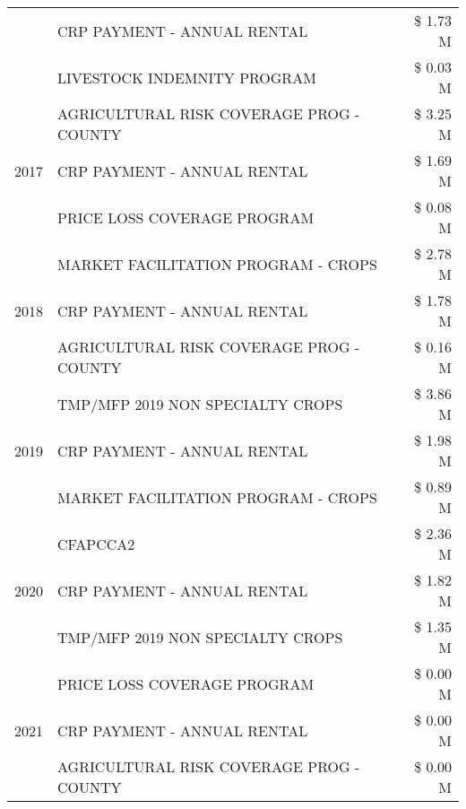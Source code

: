 \begin{tabular}{llr}
 & CRP PAYMENT - ANNUAL RENTAL & \$ 1.73 M \\
 & LIVESTOCK INDEMNITY PROGRAM & \$ 0.03 M \\
\cline{1-3}
\multirow[t]{3}{*}{2017} & AGRICULTURAL RISK COVERAGE PROG - COUNTY & \$ 3.25 M \\
 & CRP PAYMENT - ANNUAL RENTAL & \$ 1.69 M \\
 & PRICE LOSS COVERAGE PROGRAM & \$ 0.08 M \\
\cline{1-3}
\multirow[t]{3}{*}{2018} & MARKET FACILITATION PROGRAM - CROPS & \$ 2.78 M \\
 & CRP PAYMENT - ANNUAL RENTAL & \$ 1.78 M \\
 & AGRICULTURAL RISK COVERAGE PROG - COUNTY & \$ 0.16 M \\
\cline{1-3}
\multirow[t]{3}{*}{2019} & TMP/MFP 2019 NON SPECIALTY CROPS & \$ 3.86 M \\
 & CRP PAYMENT - ANNUAL RENTAL & \$ 1.98 M \\
 & MARKET FACILITATION PROGRAM - CROPS & \$ 0.89 M \\
\cline{1-3}
\multirow[t]{3}{*}{2020} & CFAPCCA2 & \$ 2.36 M \\
 & CRP PAYMENT - ANNUAL RENTAL & \$ 1.82 M \\
 & TMP/MFP 2019 NON SPECIALTY CROPS & \$ 1.35 M \\
\cline{1-3}
\multirow[t]{3}{*}{2021} & PRICE LOSS COVERAGE PROGRAM & \$ 0.00 M \\
 & CRP PAYMENT - ANNUAL RENTAL & \$ 0.00 M \\
 & AGRICULTURAL RISK COVERAGE PROG - COUNTY & \$ 0.00 M \\
\cline{1-3}
\bottomrule
\end{tabular}
